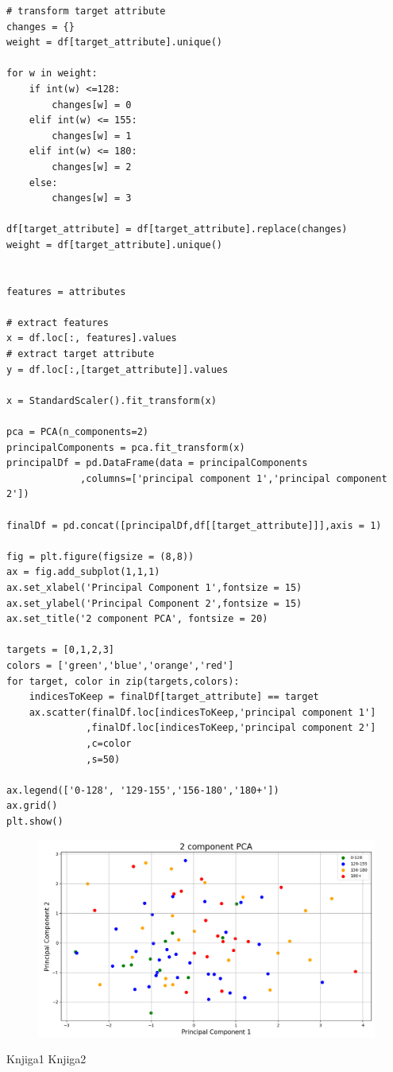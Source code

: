 \documentclass[12pt,a4paper]{article}
\begin{document}
\begin{lstlisting}
# transform target attribute
changes = {}
weight = df[target_attribute].unique()

for w in weight:
    if int(w) <=128:
        changes[w] = 0
    elif int(w) <= 155:
        changes[w] = 1
    elif int(w) <= 180:
        changes[w] = 2
    else:
        changes[w] = 3

df[target_attribute] = df[target_attribute].replace(changes)
weight = df[target_attribute].unique()


features = attributes 

# extract features
x = df.loc[:, features].values
# extract target attribute
y = df.loc[:,[target_attribute]].values

x = StandardScaler().fit_transform(x)

pca = PCA(n_components=2)
principalComponents = pca.fit_transform(x)
principalDf = pd.DataFrame(data = principalComponents
             ,columns=['principal component 1','principal component 2'])

finalDf = pd.concat([principalDf,df[[target_attribute]]],axis = 1)

fig = plt.figure(figsize = (8,8))
ax = fig.add_subplot(1,1,1) 
ax.set_xlabel('Principal Component 1',fontsize = 15)
ax.set_ylabel('Principal Component 2',fontsize = 15)
ax.set_title('2 component PCA', fontsize = 20)

targets = [0,1,2,3]
colors = ['green','blue','orange','red']
for target, color in zip(targets,colors):
    indicesToKeep = finalDf[target_attribute] == target
    ax.scatter(finalDf.loc[indicesToKeep,'principal component 1']
              ,finalDf.loc[indicesToKeep,'principal component 2']
              ,c=color
              ,s=50)

ax.legend(['0-128', '129-155','156-180','180+'])
ax.grid()
plt.show()
\end{lstlisting}

\begin{figure}[H]
  \centering
  \includegraphics[width=15cm]{pca.png}
\end{figure}



\begin{thebibliography}{9}
  Knjiga1
  Knjiga2
\end{thebibliography}
\end{document}
